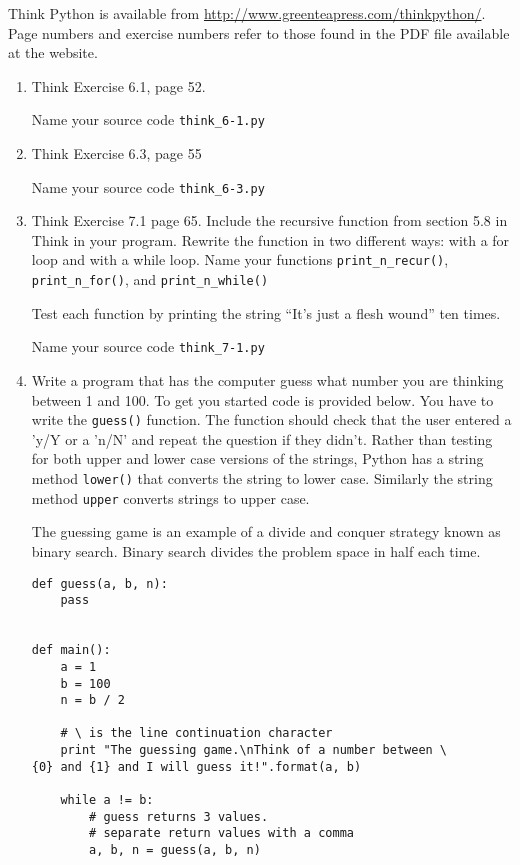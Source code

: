 \documentclass[12pt]{article}
\begin{document}
Think Python is available from \url{http://www.greenteapress.com/thinkpython/}. Page numbers and exercise numbers refer to those found in the PDF file available at the website.

\begin{enumerate}

  \item Think Exercise 6.1, page 52.

    Name your source code \texttt{think\_6-1.py}

\item Think Exercise 6.3, page 55

  Name your source code \texttt{think\_6-3.py}

  \item  Think Exercise 7.1 page 65. Include the recursive function from section 5.8 in Think in your program. Rewrite the function in two different ways: with a for loop and with a while loop. Name your functions \texttt{print\_n\_recur()}, \texttt{print\_n\_for()}, and \texttt{print\_n\_while()}
    
Test each function by printing the string ``It's just a flesh wound'' ten times. 

Name your source code \texttt{think\_7-1.py}


\item Write a program that has the computer guess what number you are thinking between 1 and 100. To get you started code is provided below. You have to write the \texttt{guess()} function. The function should check that the user entered a 'y/Y or a 'n/N' and repeat the question if they didn't. Rather than testing for both upper and lower case versions of the strings, Python has a string method \texttt{lower()} that converts the string to lower case. Similarly the string method \texttt{upper} converts strings to upper case.

The guessing game is an example of a divide and conquer strategy known as binary search. Binary search divides the problem space in half each time.

\begin{lstlisting}[style=c]
def guess(a, b, n):
    pass
    

def main():
    a = 1
    b = 100
    n = b / 2

    # \ is the line continuation character 
    print "The guessing game.\nThink of a number between \
{0} and {1} and I will guess it!".format(a, b)

    while a != b:
        # guess returns 3 values. 
        # separate return values with a comma
        a, b, n = guess(a, b, n)


\end{lstlisting}
\end{enumerate}
\end{document}
